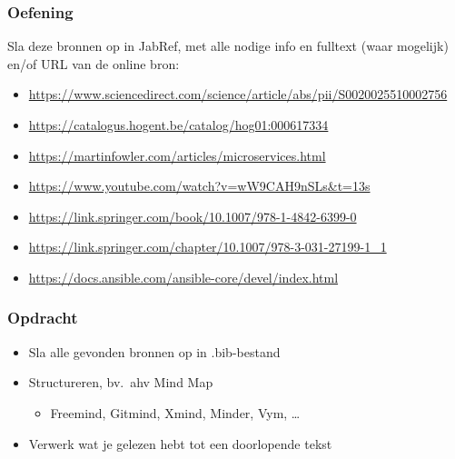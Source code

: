 \documentclass[aspectratio=169]{beamer}
\begin{document}
\begin{frame}[plain]
  \frametitle{Oefening}

  Sla deze bronnen op in JabRef, met alle nodige info en fulltext (waar mogelijk) en/of URL van de online bron:

  \bigskip

  \begin{itemize}
    \item \url{https://www.sciencedirect.com/science/article/abs/pii/S0020025510002756}
    \item \url{https://catalogus.hogent.be/catalog/hog01:000617334}
    \item \url{https://martinfowler.com/articles/microservices.html}
    \item \url{https://www.youtube.com/watch?v=wW9CAH9nSLs&t=13s}
    \item \url{https://link.springer.com/book/10.1007/978-1-4842-6399-0}
    \item \url{https://link.springer.com/chapter/10.1007/978-3-031-27199-1_1}
    \item \url{https://docs.ansible.com/ansible-core/devel/index.html}
  \end{itemize}

\end{frame}

\begin{frame}
  \frametitle{Opdracht}

  \begin{itemize}
    \item Sla alle gevonden bronnen op in .bib-bestand
    \item Structureren, bv.\ ahv Mind Map
          \begin{itemize}
            \item Freemind, Gitmind, Xmind, Minder, Vym, \ldots
          \end{itemize}
    \item Verwerk wat je gelezen hebt tot een doorlopende tekst
  \end{itemize}

  \bigskip

\end{frame}
\end{document}
